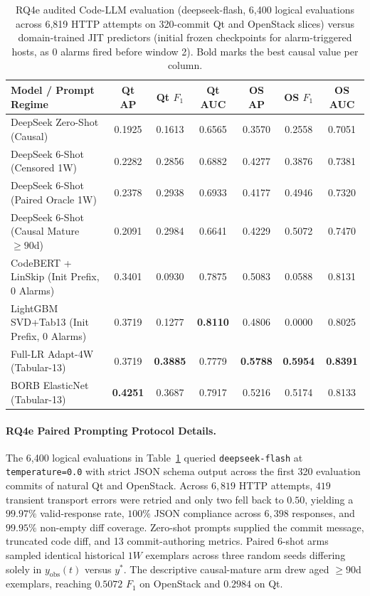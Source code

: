 \documentclass[10pt,a4paper]{article}
\begin{document}
\begin{table}[!htbp]
\centering
\caption{RQ4e audited Code-LLM evaluation (deepseek-flash, 6,400 logical evaluations across 6,819 HTTP attempts on 320-commit Qt and OpenStack slices) versus domain-trained JIT predictors (initial frozen checkpoints for alarm-triggered hosts, as 0 alarms fired before window 2). Bold marks the best causal value per column.}
\label{tab:rq4f_llm}
\fontsize{7.5}{9.0}\selectfont
\setlength{\tabcolsep}{2.2pt}
\begin{tabular*}{\textwidth}{@{\extracolsep\fill}lcccccc@{}}
\toprule
\textbf{Model / Prompt Regime} & \textbf{Qt AP} & \textbf{Qt $F_1$} & \textbf{Qt AUC} & \textbf{OS AP} & \textbf{OS $F_1$} & \textbf{OS AUC} \\
\midrule
DeepSeek Zero-Shot (Causal) & 0.1925 & 0.1613 & 0.6565 & 0.3570 & 0.2558 & 0.7051 \\
DeepSeek 6-Shot (Censored 1W) & 0.2282 & 0.2856 & 0.6882 & 0.4277 & 0.3876 & 0.7381 \\
DeepSeek 6-Shot (Paired Oracle 1W) & 0.2378 & 0.2938 & 0.6933 & 0.4177 & 0.4946 & 0.7320 \\
DeepSeek 6-Shot (Causal Mature $\ge 90$d) & 0.2091 & 0.2984 & 0.6641 & 0.4229 & 0.5072 & 0.7470 \\
\midrule
CodeBERT + LinSkip (Init Prefix, 0 Alarms) & 0.3401 & 0.0930 & 0.7875 & 0.5083 & 0.0588 & 0.8131 \\
LightGBM SVD+Tab13 (Init Prefix, 0 Alarms) & 0.3719 & 0.1277 & \textbf{0.8110} & 0.4806 & 0.0000 & 0.8025 \\
Full-LR Adapt-4W (Tabular-13) & 0.3719 & \textbf{0.3885} & 0.7779 & \textbf{0.5788} & \textbf{0.5954} & \textbf{0.8391} \\
BORB ElasticNet (Tabular-13) & \textbf{0.4251} & 0.3687 & 0.7917 & 0.5216 & 0.5174 & 0.8133 \\
\bottomrule
\end{tabular*}
\end{table}

\paragraph{RQ4e Paired Prompting Protocol Details.}
The 6,400 logical evaluations in Table~\ref{tab:rq4f_llm} queried \texttt{deepseek-flash} at \texttt{temperature=0.0} with strict JSON schema output across the first 320 evaluation commits of natural Qt and OpenStack. Across $6{,}819$ HTTP attempts, $419$ transient transport errors were retried and only two fell back to $0.50$, yielding a $99.97\%$ valid-response rate, $100\%$ JSON compliance across $6{,}398$ responses, and $99.95\%$ non-empty diff coverage. Zero-shot prompts supplied the commit message, truncated code diff, and 13 commit-authoring metrics. Paired 6-shot arms sampled identical historical $1W$ exemplars across three random seeds differing solely in $y_{\text{obs}}(t)$ versus $y^*$. The descriptive causal-mature arm drew aged $\ge 90\text{d}$ exemplars, reaching $0.5072$ $F_1$ on OpenStack and $0.2984$ on Qt.
\end{document}
